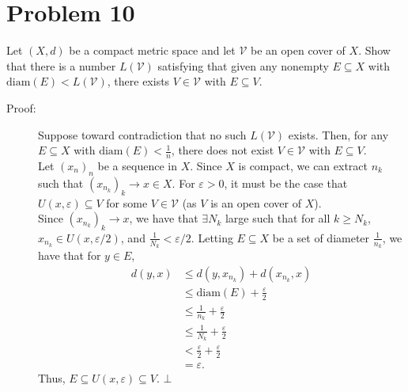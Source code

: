 \documentclass[10pt]{extarticle}
\begin{document}
  \section{Problem 10}%
  Let $(X,d)$ be a compact metric space and let $\mathcal{V}$ be an open cover of $X$. Show that there is a number $L(\mathcal{V})$ satisfying that given any nonempty $E\subseteq X$ with $\text{diam}(E) < L(\mathcal{V})$, there exists $V\in \mathcal{V}$ with $E\subseteq V$.
  \begin{description}
    \item[Proof:] Suppose toward contradiction that no such $L(\mathcal{V})$ exists. Then, for any $E\subseteq X$ with $\text{diam}(E) < \frac{1}{n}$, there does not exist $V\in \mathcal{V}$ with $E\subseteq V$.\\

      Let $(x_n)_n$ be a sequence in $X$. Since $X$ is compact, we can extract $n_k$ such that $\left(x_{n_k}\right)_k\rightarrow x\in X$. For $\varepsilon > 0$, it must be the case that $U(x,\varepsilon)\subseteq V$ for some $V\in \mathcal{V}$ (as $V$ is an open cover of $X$).\\

      Since $\left(x_{n_k}\right)_k\rightarrow x$, we have that $\exists N_k$ large such that for all $k\geq N_k$, $x_{n_k}\in U(x,\varepsilon/2)$, and $\frac{1}{N_k} < \varepsilon/2$. Letting $E\subseteq X$ be a set of diameter $\frac{1}{n_k}$, we have that for $y\in E$,
      \begin{align*}
        d(y,x) &\leq d\left(y,x_{n_k}\right) + d\left(x_{n_k},x\right)\\
               &\leq \text{diam}(E) + \frac{\varepsilon}{2}\\
               &\leq \frac{1}{n_k} + \frac{\varepsilon}{2}\\
               &\leq \frac{1}{N_k} + \frac{\varepsilon}{2}\\
               &< \frac{\varepsilon}{2} + \frac{\varepsilon}{2}\\
               &= \varepsilon.
      \end{align*}
      Thus, $E\subseteq U(x,\varepsilon)\subseteq V$. $\bot$
  \end{description}
\end{document}
